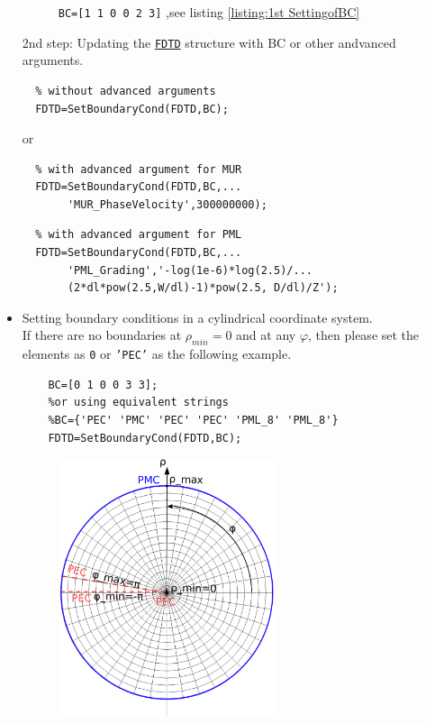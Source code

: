 \begin{itemize}
\begin{myindentpar}
\begin{figure}[ht]
		      \caption[1st example for the setting of boundary conditions]{\texttt{BC=[1 1  0 0  2 3]} ,see listing \ref{listing:1st SettingofBC}}
		      \label{fig:Ex. 1st of SetBoundaryCond}
		\end{figure}
    \end{myindentpar}
      2nd step: Updating the \hyperref[para:FDTD]{\texttt{FDTD}} structure with BC or other andvanced arguments.
      \begin{myindentpar}	    
		    \begin{lstlisting}
  % without advanced arguments
  FDTD=SetBoundaryCond(FDTD,BC); 
		    \end{lstlisting}
		      or
		    \begin{lstlisting}
  % with advanced argument for MUR
  FDTD=SetBoundaryCond(FDTD,BC,...
       'MUR_PhaseVelocity',300000000);
			\end{lstlisting}
		    \begin{lstlisting}
  % with advanced argument for PML
  FDTD=SetBoundaryCond(FDTD,BC,...
       'PML_Grading','-log(1e-6)*log(2.5)/...
       (2*dl*pow(2.5,W/dl)-1)*pow(2.5, D/dl)/Z');
		    \end{lstlisting}	 
    \end{myindentpar}	
 \item Setting boundary conditions in a cylindrical coordinate system.\\
If there are no boundaries at  $\rho_{min}=0$ and at any $\varphi$, then please set the elements as \texttt{0} or \texttt{'PEC'} as the following example.
    \begin{lstlisting}[caption={BC assignment in a cylindrical coordinate system as fig \ref{fig:Ex. SetBoundaryCond in cylin.}},label={listing:SettingofBC in a cylin.}]
	% no boundaries at rhomin=0 , phi_min and phi_max
	BC=[0 1 0 0 3 3];
	%or using equivalent strings
	%BC={'PEC' 'PMC' 'PEC' 'PEC' 'PML_8' 'PML_8'} 
	FDTD=SetBoundaryCond(FDTD,BC); 
			\end{lstlisting} 
    \begin{figure}[ht]
			  \centering
			\includegraphics[width=0.6\textwidth]{svg/CylinBCXY.eps}\qquad

\end{figure}
\end{itemize}
